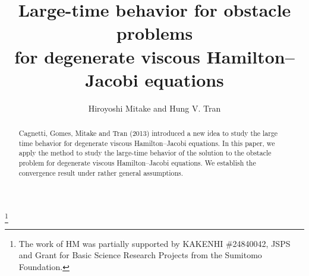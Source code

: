 \documentclass[12pt,reqno]{amsart}
\theoremstyle{plain}
\theoremstyle{remark}
\numberwithin{equation}{section}
\begin{document}
\title[Large-time behavior for obstacle problems]
{Large-time behavior for obstacle problems\\ 
for degenerate viscous Hamilton--Jacobi equations}

\author[H. MITAKE, H. V. TRAN]
{Hiroyoshi Mitake and Hung V. Tran}

\thanks{
The work of HM was partially supported by KAKENHI  
\#24840042, JSPS and Grant for Basic Science Research Projects from the 
Sumitomo Foundation. 
}

\address[H. Mitake]
{
Department of Applied Mathematics, 
Faculty of Science, Fukuoka University, 
Fukuoka 814-0180, Japan}

\address[H. V. Tran]
{
Department of Mathematics, 
The University of Chicago, 5734 S. University Avenue, Chicago, Illinois 60637, USA}


\maketitle

\begin{abstract}
Cagnetti, Gomes, Mitake and Tran (2013) introduced a new idea to study the large time behavior for degenerate viscous Hamilton--Jacobi equations. In this paper, we apply the method to study the large-time behavior of the solution to the obstacle problem for degenerate viscous Hamilton--Jacobi equations.  
We establish the convergence result under rather general assumptions. 
\end{abstract}

\tableofcontents
\end{document}
